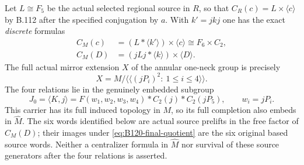 Let $L\cong F_5$ be the actual selected regional source in $R$,
so that $C_R(c)=L\times\langle c\rangle$ by B.112 after the
specified conjugation by $a$. With $k'=jkj$ one has the exact
\emph{discrete} formulas
\begin{equation}\label{eq:B120-discrete-centralizers}
 \begin{aligned}
 C_M(c)&=(L*\langle k'\rangle)\times\langle c\rangle
                      \cong F_6\times C_2,\\
 C_M(D)&=(jLj*\langle k\rangle)\times\langle D\rangle.
 \end{aligned}
\end{equation}
The full actual mirror extension $X$ of the annular one-neck group
is precisely
\begin{equation}\label{eq:B120-final-quotient}
 X=M/\langle\!\langle(jP_i)^2:\ 1\leq i\leq4\rangle\!\rangle.
\end{equation}
The four relations lie in the genuinely embedded subgroup
\begin{equation}\label{eq:B120-carrier}
 J_0=\langle K,j\rangle
    =F(w_1,w_2,w_3,w_4)*C_2(j)*C_2(jP_5),\qquad w_i=jP_i.
\end{equation}
This carrier has its full induced topology in $M$, so its full
completion also embeds in $\widehat M$.
The six words identified below are actual source prelifts in the
free factor of $C_M(D)$; their images under
\eqref{eq:B120-final-quotient} are the six original based source
words. Neither a centralizer formula in $\widehat M$ nor survival
of these source generators after the four relations is asserted.

